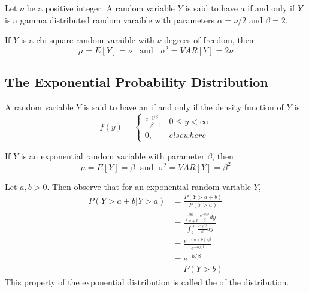 \documentclass[12pt, a4paper, twoside, openright, titlepage]{book}
\begin{document}
\begin{defn}{}{}
    Let $\nu$ be a positive integer. A random variable $Y$ is said to have a  if and only if $Y$ is a gamma distributed random varaible with parameters $\alpha = \nu/2$ and $\beta = 2$.
\end{defn}

\begin{thm}{}{}
    If $Y$ is a chi-square random varaible with $\nu$ degrees of freedom, then \begin{equation*}
        \mu = E[Y] = \nu \;\;\text{ and }\;\;\sigma^2 = VAR[Y] = 2\nu
    \end{equation*}
\end{thm}

\subsection{The Exponential Probability Distribution}

\begin{defn}{}{}
    A random variable $Y$ is said to have an  if and only if the density function of $Y$ is \begin{equation*}
        f(y) = \left\{\begin{array}{lc} \frac{e^{-y/\beta}}{\beta}, & 0 \leq y < \infty \\ 0, & elsewhere \end{array}\right.
    \end{equation*}
\end{defn}

\begin{thm}{}{}
    If $Y$ is an exponential random variable with parameter $\beta$, then \begin{equation*}
        \mu = E[Y] = \beta\;\text{ and }\;\sigma^2 = VAR[Y] = \beta^2
    \end{equation*}
\end{thm}

\begin{props}
    Let $a, b >0$. Then observe that for an exponential random variable $Y$, \begin{align*}
        P(Y > a+b \vert Y >a) &= \frac{P(Y>a+b)}{P(Y>a)} \\
        &= \frac{\int_{a+b}^{\infty}\frac{e^{-y/\beta}}{\beta}dy}{\int_{a}^{\infty}\frac{e^{-y/\beta}}{\beta}dy} \\
        &= \frac{e^{-(a+b)/\beta}}{e^{-a/\beta}} \\
        &= e^{-b/\beta} \\
        &= P(Y > b)
    \end{align*}
    This property of the exponential distribution is called the  of the distribution.
\end{props}
\end{document}

